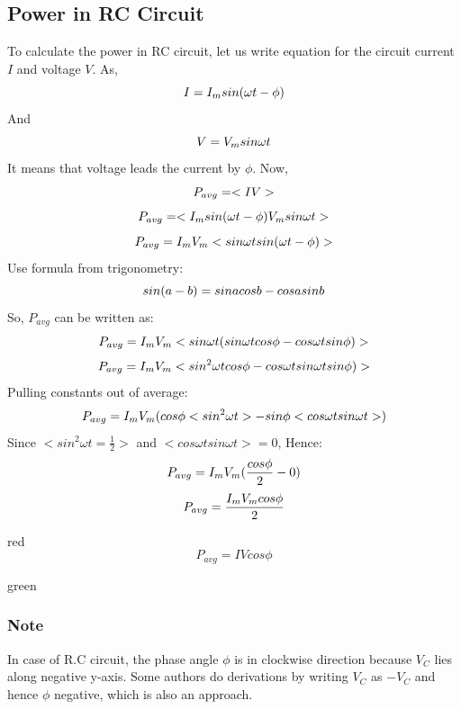 \subsection*{Power in RC Circuit}
To calculate the power in RC circuit,
let us write equation for the circuit current $I$ and voltage $V$.
As,
\begin{equation}\notag
    I = I_{m} sin (\omega t - \phi)
\end{equation}
And
\begin{equation}\notag
    V = V_{m} sin \omega t
\end{equation}
It means that voltage leads the current by $\phi$. Now,
\begin{equation}\notag
   P_{avg}=<IV>
\end{equation}
\begin{equation}\notag
   P_{avg}=<I_{m} sin (\omega t - \phi)  V_{m} sin \omega t >
\end{equation}
\begin{equation}\notag
   P_{avg}=I_{m}  V_{m}<  sin \omega t sin (\omega t - \phi)  >
\end{equation}
Use formula from trigonometry:
\begin{equation}\notag
   sin(a-b)=sina cosb-cosa sinb
\end{equation}
So, $P_{avg}$ can be written as:
\begin{equation}\notag
   P_{avg}=I_{m}  V_{m}<  sin \omega t (sin \omega t cos \phi - cos \omega t sin \phi )  >
\end{equation}
\begin{equation}\notag
   P_{avg}=I_{m}  V_{m}<  sin^{2} \omega t cos \phi - cos \omega t sin\omega t sin \phi )  >
\end{equation}
Pulling constants out of average:
\begin{equation}\notag
   P_{avg}=I_{m}  V_{m}(  cos \phi <sin^{2} \omega t> -sin \phi< cos \omega t sin\omega t > )  
\end{equation}
Since $<sin^{2} \omega t = \frac{1}{2}>$ and $<cos \omega t sin\omega t>=0$,
Hence:
\begin{equation}\notag
   P_{avg} =I_{m}  V_{m}(\frac{cos \phi}{2}-0)
\end{equation}
\begin{equation}\notag
   P_{avg} = \frac{I_{m}  V_{m} cos \phi}{2}
\end{equation}
\begin{mybox}{red}{}
\begin{equation}\label{eq:15.33}
   P_{avg} = I V cos \phi
\end{equation}
\end{mybox}
\begin{mybox}{green}{}
\subsubsection{Note}
In case of R.C circuit, the phase angle $\phi$ is in clockwise
direction because $V_{C}$ lies along negative y-axis. Some
authors do derivations by writing $V_{C}$ as $-V_{C}$  and hence
$\phi$ negative, which is also an approach. 
\end{mybox}
